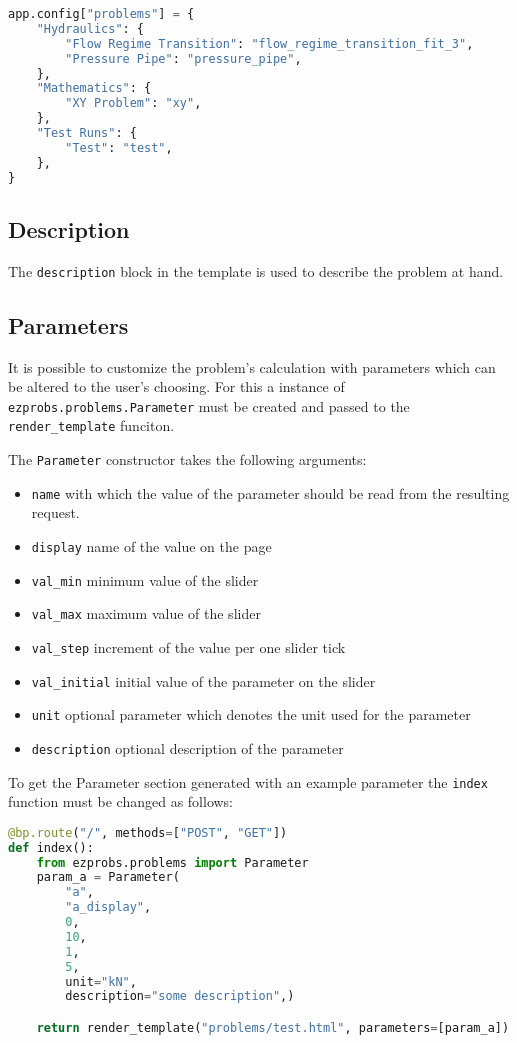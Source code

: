 \begin{lstlisting}[language=python]
app.config["problems"] = {
    "Hydraulics": {
        "Flow Regime Transition": "flow_regime_transition_fit_3",
        "Pressure Pipe": "pressure_pipe",
    },
    "Mathematics": {
        "XY Problem": "xy",
    },
    "Test Runs": {
        "Test": "test",
    },
}
\end{lstlisting}

\subsection{Description}

The \verb+description+ block in the template is used to describe the problem at hand.

\subsection{Parameters}

It is possible to customize the problem's calculation with parameters which can
be altered to the user's choosing. For this a instance of
\verb+ezprobs.problems.Parameter+ must be created and passed to the
\verb+render_template+ funciton.

The \verb+Parameter+ constructor takes the following arguments:
\begin{itemize}
  \item \verb+name+ with which the value of the parameter should be read from the resulting request.
  \item \verb+display+ name of the value on the page
  \item \verb+val_min+ minimum value of the slider
  \item \verb+val_max+ maximum value of the slider
  \item \verb+val_step+ increment of the value per one slider tick
  \item \verb+val_initial+ initial value of the parameter on the slider
  \item \verb+unit+ optional parameter which denotes the unit used for the parameter
  \item \verb+description+ optional description of the parameter
\end{itemize}

To get the Parameter section generated with an example parameter the
\verb+index+ function must be changed as follows:

\begin{lstlisting}[language=python]
@bp.route("/", methods=["POST", "GET"])
def index():
    from ezprobs.problems import Parameter
    param_a = Parameter(
        "a",
        "a_display",
        0,
        10,
        1,
        5,
        unit="kN",
        description="some description",)

    return render_template("problems/test.html", parameters=[param_a])
\end{lstlisting}

